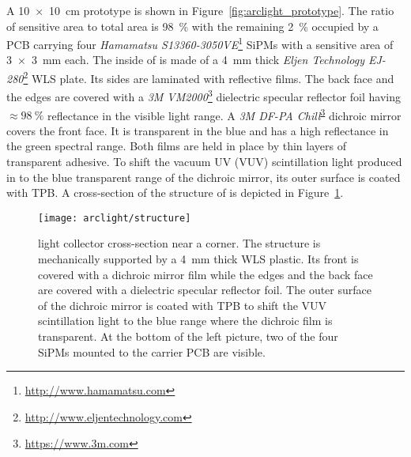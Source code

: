 A \SI{10 x 10}{\centi\metre} \AL{} prototype is shown in Figure~\ref{fig:arclight_prototype}.
The ratio of sensitive area to total area is \SI{98}{\percent} with the remaining \SI{2}{\percent} occupied by a PCB carrying four \emph{Hamamatsu S13360-3050VE}\footnote{\url{http://www.hamamatsu.com}} SiPMs with a sensitive area of \SI{3 x 3}{\milli\metre} each.
The inside of \AL{} is made of a \SI{4}{\milli\metre} thick \emph{Eljen Technology EJ-280}\footnote{\url{http://www.eljentechnology.com}} WLS plate.
Its sides are laminated with reflective films.
The back face and the edges are covered with a \emph{3M VM2000}\footnote{\url{https://www.3m.com}\label{foot:3M}} dielectric specular reflector foil having $\approx \SI{98}{\percent}$ reflectance in the visible light range.
A \emph{3M DF-PA Chill}\textsuperscript{\ref{foot:3M}} dichroic mirror covers the front face.
It is transparent in the blue and has a high reflectance in the green spectral range.
Both films are held in place by thin layers of transparent adhesive.
To shift the vacuum UV (VUV) scintillation light produced in \lar{} to the blue transparent range of the dichroic mirror, its outer surface is coated with TPB.
A cross-section of the structure of \AL{} is depicted in Figure~\ref{fig:arclight_structure}.

\begin{figure}[htb]
	\centering
	\texttt{[image: arclight/structure]}
	\caption{\AL{} light collector cross-section near a corner.
		The structure is mechanically supported by a \SI{4}{\milli\metre} thick WLS plastic.
		Its front is covered with a dichroic mirror film while the edges and the back face are covered with a dielectric specular reflector foil.
		The outer surface of the dichroic mirror is coated with TPB to shift the \lar{} VUV scintillation light to the blue range where the dichroic film is transparent.
		At the bottom of the left picture, two of the four SiPMs mounted to the carrier PCB are visible.}
	\label{fig:arclight_structure}
\end{figure}


\todo[inline, color=red]{\AL{}}
